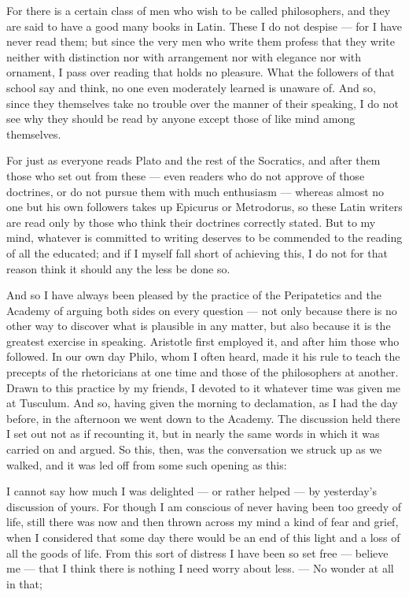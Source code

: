  For there is a certain class of men who wish to be called philosophers, and they are said to have a good many books in Latin. These I do not despise — for I have never read them; but since the very men who write them profess that they write neither with distinction nor with arrangement nor with elegance nor with ornament, I pass over reading that holds no pleasure. What the followers of that school say and think, no one even moderately learned is unaware of. And so, since they themselves take no trouble over the manner of their speaking, I do not see why they should be read by anyone except those of like mind among themselves.

 For just as everyone reads Plato and the rest of the Socratics, and after them those who set out from these — even readers who do not approve of those doctrines, or do not pursue them with much enthusiasm — whereas almost no one but his own followers takes up Epicurus or Metrodorus, so these Latin writers are read only by those who think their doctrines correctly stated. But to my mind, whatever is committed to writing deserves to be commended to the reading of all the educated; and if I myself fall short of achieving this, I do not for that reason think it should any the less be done so.

 And so I have always been pleased by the practice of the Peripatetics and the Academy of arguing both sides on every question — not only because there is no other way to discover what is plausible in any matter, but also because it is the greatest exercise in speaking. Aristotle first employed it, and after him those who followed. In our own day Philo, whom I often heard, made it his rule to teach the precepts of the rhetoricians at one time and those of the philosophers at another. Drawn to this practice by my friends, I devoted to it whatever time was given me at Tusculum. And so, having given the morning to declamation, as I had the day before, in the afternoon we went down to the Academy. The discussion held there I set out not as if recounting it, but in nearly the same words in which it was carried on and argued. So this, then, was the conversation we struck up as we walked, and it was led off from some such opening as this:

 I cannot say how much I was delighted — or rather helped — by yesterday's discussion of yours. For though I am conscious of never having been too greedy of life, still there was now and then thrown across my mind a kind of fear and grief, when I considered that some day there would be an end of this light and a loss of all the goods of life. From this sort of distress I have been so set free — believe me — that I think there is nothing I need worry about less. — No wonder at all in that;

